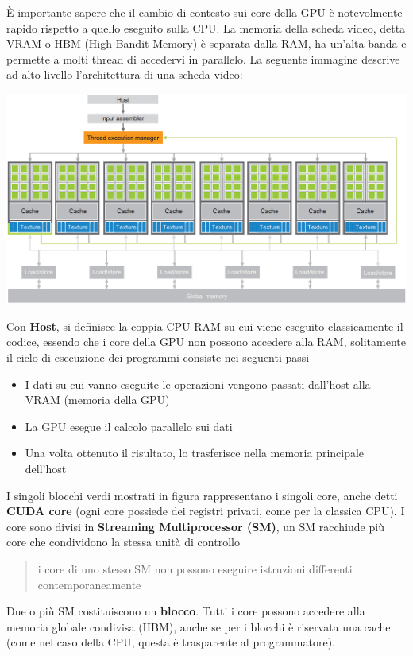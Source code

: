 \documentclass[10pt, letterpaper]{report}
\begin{document}
È importante sapere che il cambio di contesto sui core della GPU è notevolmente rapido rispetto a quello eseguito sulla CPU. La memoria della scheda video, detta VRAM o HBM (High Bandit Memory) è separata dalla RAM, ha un'alta banda e permette a molti thread di accedervi in parallelo.\acc 
La seguente immagine descrive ad alto livello l'architettura di una scheda video:\begin{center}
    \includegraphics[width=\textwidth ]{images/architetturaGPU.png}
\end{center}
Con \textbf{Host}, si definisce la coppia CPU-RAM su cui viene eseguito classicamente il codice, essendo che i core della GPU non possono accedere alla RAM, solitamente il ciclo di esecuzione dei programmi consiste nei seguenti passi\begin{itemize}
    \item I dati su cui vanno eseguite le operazioni vengono passati dall'host alla VRAM (memoria della GPU)
    \item La GPU esegue il calcolo parallelo sui dati 
    \item Una volta ottenuto il risultato, lo trasferisce nella memoria principale dell'host
\end{itemize}
I singoli blocchi verdi mostrati in figura rappresentano i singoli core, anche detti \textbf{CUDA core} (ogni core possiede dei registri privati, come per la classica CPU). I core sono divisi in \textbf{Streaming Multiprocessor (SM)}, un SM racchiude più core che condividono la stessa unità di controllo\begin{quote}
    i core di uno stesso SM non possono eseguire istruzioni differenti contemporaneamente
\end{quote}
Due o più SM costituiscono un \textbf{blocco}. Tutti i core possono accedere alla memoria globale condivisa (HBM), anche se per i blocchi è riservata una cache (come nel caso della CPU, questa è trasparente al programmatore).
\end{document}
